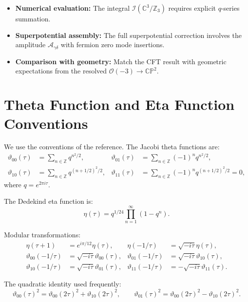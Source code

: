 \documentclass[11pt]{article}
\newcommand{\Z}{\mathbb{Z}}
\newcommand{\C}{\mathbb{C}}
\newcommand{\CP}{\mathbb{CP}}
\newcommand{\cO}{\mathcal{O}}
\newcommand{\vt}{\vartheta}
\begin{document}
\begin{itemize}
\item \textbf{Numerical evaluation:} The integral $\mathcal{I}(\C^3/\Z_3)$ requires explicit $q$-series summation.
\item \textbf{Superpotential assembly:} The full superpotential correction involves the amplitude $\mathcal{A}_{\gamma\delta}$ with fermion zero mode insertions.
\item \textbf{Comparison with geometry:} Match the CFT result with geometric expectations from the resolved $\cO(-3) \to \CP^2$.
\end{itemize}

\appendix

\section{Theta Function and Eta Function Conventions}\label{app:theta}

We use the conventions of the reference. The Jacobi theta functions are:
\begin{align}
\vt_{00}(\tau) &= \sum_{n \in \Z} q^{n^2/2}, & \vt_{01}(\tau) &= \sum_{n \in \Z} (-1)^n q^{n^2/2}, \\
\vt_{10}(\tau) &= \sum_{n \in \Z} q^{(n+1/2)^2/2}, & \vt_{11}(\tau) &= \sum_{n \in \Z} (-1)^n q^{(n+1/2)^2/2} = 0,
\end{align}
where $q = e^{2\pi i \tau}$.

The Dedekind eta function is:
\begin{equation}
\eta(\tau) = q^{1/24} \prod_{n=1}^\infty (1 - q^n).
\end{equation}

Modular transformations:
\begin{align}
\eta(\tau + 1) &= e^{i\pi/12} \eta(\tau), & \eta(-1/\tau) &= \sqrt{-i\tau} \eta(\tau), \\
\vt_{00}(-1/\tau) &= \sqrt{-i\tau} \vt_{00}(\tau), & \vt_{01}(-1/\tau) &= \sqrt{-i\tau} \vt_{10}(\tau), \\
\vt_{10}(-1/\tau) &= \sqrt{-i\tau} \vt_{01}(\tau), & \vt_{11}(-1/\tau) &= -\sqrt{-i\tau} \vt_{11}(\tau).
\end{align}

The quadratic identity used frequently:
\begin{equation}
\vt_{00}(\tau)^2 = \vt_{00}(2\tau)^2 + \vt_{10}(2\tau)^2, \qquad \vt_{01}(\tau)^2 = \vt_{00}(2\tau)^2 - \vt_{10}(2\tau)^2.
\end{equation}
\end{document}
